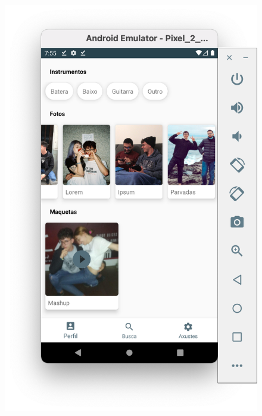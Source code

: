 \documentclass[a4paper,12pt]{article}
\begin{document}
\begin{figure}[H]
	\centering
	\includegraphics[scale=.42]{3.png}
\end{figure}
\end{document}
